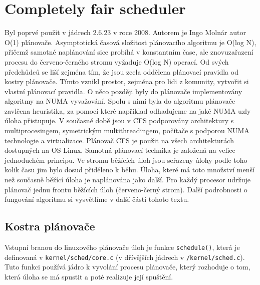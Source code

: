 \documentclass[
  master=true,
  font=sans,
  printversion=false,
  joinlists=true,
  figures=true,
  tables=true,
  sourcecodes=false,
  theorems=false,
  bibencoding=utf8,
  language=czech,
  encoding=utf8,
  field=ainfk,
  biblatex,
  glossaries,
  index
]{kidiplom}
\begin{document}
\section{Completely fair scheduler}%

Byl poprvé použit v jádrech 2.6.23 v roce 2008. Autorem je Ingo Molnár autor O(1) plánovače. Asymptotická časová složitost plánovacího algoritmu je O(log N), přičemž samotné naplánování sice probíhá v konstantním čase, ale znovuzařazení procesu do červeno-černého stromu vyžaduje O(log N) operací. Od svých předchůdců se liší zejména tím, že jsou zcela oddělena plánovací pravidla od kostry plánovače. Tímto vznikl prostor, zejména pro lidi z komunity, vytvořit si vlastní plánovací pravidla. O něco později byly do plánovače implementovány algoritmy na NUMA vyvažování. Spolu s nimi byla do algoritmu plánovače zavlčena heuristika, za pomocí které například odhadujeme na jaké NUMA uzly úloha přistupuje. V současné době jsou v CFS podporovány architektury s multiprocesingem, symetrickým multithreadingem, počítače s podporou NUMA technologie a virtualizace. Plánovač CFS je použit na všech architekturách dostupných na OS Linux. Samotná plánovací technika je založená na velice jednoduchém principu. Ve stromu běžících úloh jsou seřazeny úlohy podle toho kolik času jim bylo dosud přiděleno k běhu. Úloha, které má toto množství menší než současně běžící úloha je naplánována jako další. Pro každý procesor udržuje plánovač jednu frontu běžících úloh (červeno-černý strom). Další podrobnosti o fungování algoritmu si vysvětlíme v další části tohoto textu.

\subsection{Kostra plánovače}
Vstupní branou do linuxového plánovače úloh je funkce \verb#schedule()#, která je definovaná v \verb#kernel/sched/core.c# (v dřívějších jádrech v \verb#/kernel/sched.c#). Tuto funkci používá jádro k vyvolání procesu plánovače, který rozhoduje o tom, která úloha se má spustit a poté realizuje její spuštění. 
\end{document}
